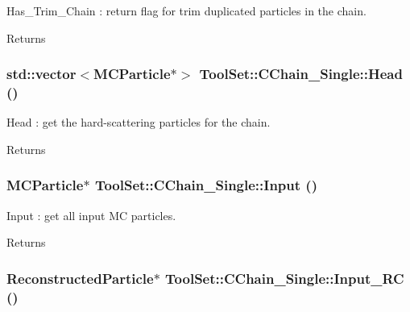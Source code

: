 Has\_\-Trim\_\-Chain : return flag for trim duplicated particles in the chain. \begin{DoxyReturn}{Returns}

\end{DoxyReturn}
\hypertarget{classToolSet_1_1CChain__Single_a583818358adab4a442ebe74a1ed7d5fd}{
\subsubsection[{Head}]{\setlength{\rightskip}{0pt plus 5cm}std::vector$<$MCParticle$\ast$$>$ ToolSet::CChain\_\-Single::Head ()}}
\label{classToolSet_1_1CChain__Single_a583818358adab4a442ebe74a1ed7d5fd}


Head : get the hard-\/scattering particles for the chain. \begin{DoxyReturn}{Returns}

\end{DoxyReturn}
\hypertarget{classToolSet_1_1CChain__Single_a083e8042cf9d2ede88f69037a318cbae}{
\subsubsection[{Input}]{\setlength{\rightskip}{0pt plus 5cm}MCParticle$\ast$ ToolSet::CChain\_\-Single::Input ()}}
\label{classToolSet_1_1CChain__Single_a083e8042cf9d2ede88f69037a318cbae}


Input : get all input MC particles. \begin{DoxyReturn}{Returns}

\end{DoxyReturn}
\hypertarget{classToolSet_1_1CChain__Single_a9c9c897ea89b3d8adf3b71d119a66324}{
\subsubsection[{Input\_\-RC}]{\setlength{\rightskip}{0pt plus 5cm}ReconstructedParticle$\ast$ ToolSet::CChain\_\-Single::Input\_\-RC ()}}
\label{classToolSet_1_1CChain__Single_a9c9c897ea89b3d8adf3b71d119a66324}


